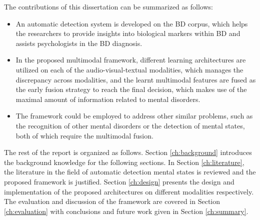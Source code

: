 The contributions of this dissertation can be summarized as follows:
\begin{itemize}
    \item An automatic detection system is developed on the BD corpus, which helps the researchers to provide insights into biological markers within BD and assists psychologists in the BD diagnosis.
    \item In the proposed multimodal framework, different learning architectures are utilized on each of the audio-visual-textual modalities, which manages the discrepancy across modalities, and the learnt multimodal features are fused as the early fusion strategy to reach the final decision, which makes use of the maximal amount of information related to mental disorders.
    \item The framework could be employed to address other similar problems, such as the recognition of other mental disorders or the detection of mental states, both of which require the multimodal fusion.
\end{itemize}


The rest of the report is organized as follows. Section \ref{ch:background} introduces the background knowledge for the following sections. In Section \ref{ch:literature}, the literature in the field of automatic detection mental states is reviewed and the proposed framework is justified. Section \ref{ch:design} presents the design and implementation of the proposed architectures on different modalities respectively. The evaluation and discussion of the framework are covered in Section \ref{ch:evaluation} with conclusions and future work given in Section \ref{ch:summary}.

